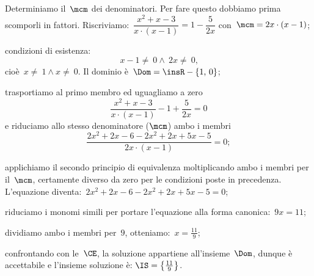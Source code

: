 \begin{exrig}
\begin{enumeratea}
 \item Determiniamo il~$\mcm$ dei denominatori. Per fare questo dobbiamo prima scomporli in fattori.
    Riscriviamo:~$\dfrac{x^{2}+x-3}{x\cdot (x-1)}=1-\dfrac{5}{2x}$ con~$\mcm=2x\cdot (x-1)$;
 \item condizioni di esistenza: \[x-1\neq~0\wedge~2x\neq~0\text{,}\] cioè~$x\neq~1\wedge x\neq~0$. Il dominio è~$\Dom=\insR-\{1\text{,~}0\}$;
 \item trasportiamo al primo membro ed uguagliamo a zero \[\frac{x^{2}+x-3}{x\cdot (x-1)}-1+\frac{5}{2x}=0\]
    e riduciamo allo stesso denominatore ($\mcm$) ambo i membri \[\frac{2x^{2}+2x-6-2x^{2}+2x+5x-5}{2x\cdot (x-1)}=0;\]
 \item applichiamo il secondo principio di equivalenza moltiplicando ambo i membri per il~$\mcm$,
    certamente diverso da zero per le condizioni poste in precedenza. L'equazione diventa:~$2x^{2}+2x-6-2x^{2}+2x+5x-5=0$;
 \item riduciamo i monomi simili per portare l'equazione alla forma canonica:~$9x=11$;
 \item dividiamo ambo i membri per~$9$, otteniamo:~$x=\frac{11}{9}$;
 \item confrontando con le~$\CE$, la soluzione appartiene all'insieme~$\Dom$, dunque è accettabile e l'insieme soluzione è:
    $\IS=\left\{\frac{11}{9}\right\}$.
\end{enumeratea}

\end{exrig}

\ovalbox{\risolvii \ref{ese:18.1}, \ref{ese:18.2}, \ref{ese:18.3}, \ref{ese:18.4}, \ref{ese:18.5}, \ref{ese:18.6}, \ref{ese:18.7},
\ref{ese:18.8}, \ref{ese:18.9}, \ref{ese:18.10}, \ref{ese:18.11}}

\vspazio\ovalbox{\ref{ese:18.12}, \ref{ese:18.13}, \ref{ese:18.14}, \ref{ese:18.15}, \ref{ese:18.16}, \ref{ese:18.17}, \ref{ese:18.18}, \ref{ese:18.19}, \ref{ese:18.20}, \ref{ese:18.21}}

\newpage

\cleardoublepage

